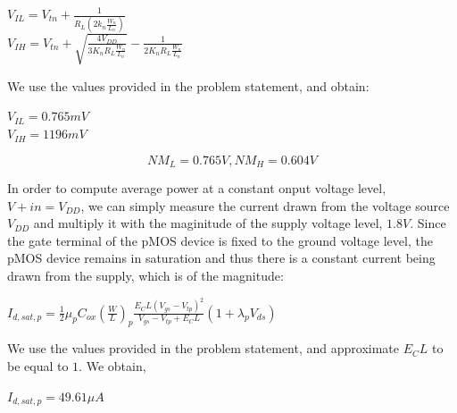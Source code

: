 \documentclass[12pt,a4paper]{article}
\begin{document}
\doublespacing
\begin{center}
    $V_{IL} = V_{tn} + \frac{1}{R_L(2k_n\frac{W_n}{L_n})}$ \\
    $V_{IH} = V_{tn} + \sqrt{\frac{4V_{DD}}{3K_nR_L\frac{W_n}{L_n}}} - \frac{1}{2K_nR_L\frac{W_n}{L_n}}$
\end{center}
\singlespacing

\noindent We use the values provided in the problem statement, and obtain:

\begin{center}
    $V_{IL} = 0.765 mV$ \\
    $V_{IH} = 1196 mV$
\end{center}

\begin{equation}
    \label{eq:expt1-noise-margins}
    NM_L = 0.765V, NM_H = 0.604V
\end{equation}

\noindent In order to compute average power at a constant onput voltage level, $V+{in} = V_{DD}$, we can simply measure the current drawn from the voltage source $V_{DD}$ and multiply it with the maginitude of the supply voltage level, $1.8V$.
Since the gate terminal of the pMOS device is fixed to the ground voltage level, the pMOS device remains in saturation and thus there is a constant current being drawn from the supply, which is of the magnitude:

\doublespacing
\begin{center}
    $I_{d,sat,p} = \frac{1}{2}\mu_{p}C_{ox}(\frac{W}{L})_{p}\frac{E_{C}L(V_{gs}-V_{tp})^{2}}{V_{gs}-V_{tp}+E_{C}L}(1+\lambda_{p} V_{ds})$ %
\end{center}
\singlespacing

\noindent We use the values provided in the problem statement, and approximate $E_CL$ to be equal to $1$. We obtain,

\doublespacing
\begin{center}
    $I_{d,sat,p} = 49.61 \mu A$ %
\end{center}
\singlespacing
\end{document}
